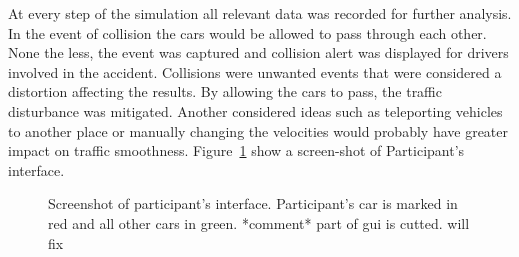 \documentclass[11pt,english]{article}
\begin{document}
At every step of the simulation all relevant data was recorded for further analysis. In the event of collision the cars would be allowed to pass through each other. None the less, the event was captured and collision alert was displayed for drivers involved in the accident. Collisions were unwanted events that were considered a distortion affecting the results. By allowing the cars to pass, the traffic disturbance was mitigated. Another considered ideas such as teleporting vehicles to another place or manually changing the velocities would probably have greater impact on traffic smoothness. Figure~\ref{fig:gui_4} show a screen-shot of Participant's interface.


\begin{figure}[] %
\caption{Screenshot of participant's interface. Participant's car is marked in red and all other cars in green. *comment* part of gui is cutted. will fix}
\label{fig:gui_4}
\end{figure}














\end{document}
